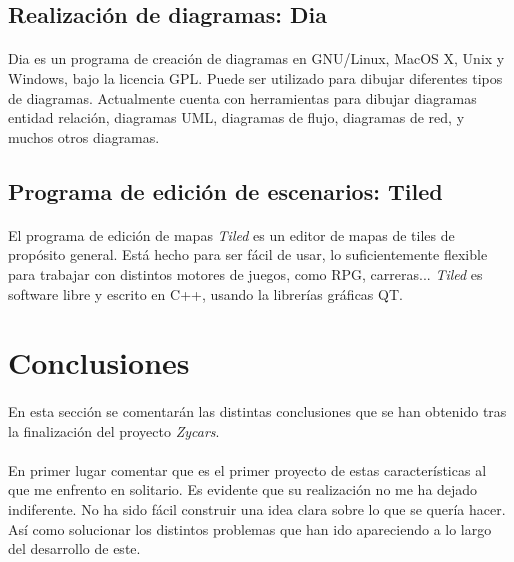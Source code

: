 \documentclass[a4paper,11pt]{article} %
\begin{document}
\subsection{Realización de diagramas: Dia}

\paragraph{}
Dia es un programa de creación de diagramas en GNU/Linux, MacOS X, Unix y Windows, bajo la 
licencia GPL. Puede ser utilizado para dibujar diferentes tipos de diagramas. Actualmente cuenta con herramientas para dibujar 
diagramas entidad relación, diagramas UML, diagramas de flujo, diagramas de red, y muchos otros diagramas.

\subsection{Programa de edición de escenarios: Tiled}

\paragraph{}
El programa de edición de mapas \emph{Tiled} es
un editor de mapas de tiles de propósito general.
Está hecho para ser fácil de usar, lo suficientemente flexible para trabajar con distintos motores de juegos, como RPG, carreras... 
\emph{Tiled} es software libre y escrito en C++, usando la librerías gráficas QT.

\section{Conclusiones}

\paragraph{}
En esta sección se comentarán las distintas conclusiones que se han obtenido tras la finalización del proyecto \emph{Zycars}.

\paragraph{}
En primer lugar comentar que es el primer proyecto de estas características al que me enfrento en solitario. Es evidente que su
realización no me ha dejado indiferente. No ha sido fácil construir una idea clara sobre lo que se quería hacer. Así como
solucionar los distintos problemas que han ido apareciendo a lo largo del desarrollo de este.
\end{document}
